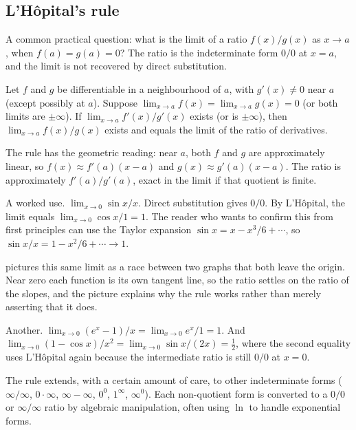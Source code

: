 \subsection{L'H\^opital's rule}

A common practical question: what is the limit of a ratio
$f(x)/g(x)$ as $x \to a$, when $f(a) = g(a) = 0$? The ratio is
the indeterminate form $0/0$ at $x = a$, and the limit is not
recovered by direct substitution.

\begin{theorem}
Let $f$ and $g$ be differentiable in a neighbourhood of $a$, with
$g'(x) \neq 0$ near $a$ (except possibly at $a$). Suppose
$\lim_{x \to a} f(x) = \lim_{x \to a} g(x) = 0$ (or both limits
are $\pm \infty$). If $\lim_{x \to a} f'(x)/g'(x)$ exists (or is
$\pm \infty$), then $\lim_{x \to a} f(x)/g(x)$ exists and equals
the limit of the ratio of derivatives.
\end{theorem}

The rule has the geometric reading: near $a$, both $f$ and $g$
are approximately linear, so $f(x) \approx f'(a)(x - a)$ and
$g(x) \approx g'(a)(x - a)$. The ratio is approximately
$f'(a)/g'(a)$, exact in the limit if that quotient is finite.

A worked use. $\lim_{x \to 0} \sin x / x$. Direct substitution
gives $0/0$. By L'H\^opital, the limit equals $\lim_{x \to 0}
\cos x / 1 = 1$. The reader who wants to confirm this from first
principles can use the Taylor expansion $\sin x = x - x^{3}/6 +
\cdots$, so $\sin x / x = 1 - x^{2}/6 + \cdots \to 1$.



 pictures this same
limit as a race between two graphs that both leave the origin. Near
zero each function is its own tangent line, so the ratio settles on
the ratio of the slopes, and the picture explains why the rule works
rather than merely asserting that it does.

Another. $\lim_{x \to 0} (e^{x} - 1)/x = \lim_{x \to 0} e^{x}/1
= 1$. And $\lim_{x \to 0} (1 - \cos x)/x^{2} = \lim_{x \to 0}
\sin x / (2 x) = \tfrac{1}{2}$, where the second equality uses
L'H\^opital again because the intermediate ratio is still $0/0$
at $x = 0$.

The rule extends, with a certain amount of care, to other
indeterminate forms ($\infty/\infty$, $0 \cdot \infty$,
$\infty - \infty$, $0^{0}$, $1^{\infty}$, $\infty^{0}$). Each
non-quotient form is converted to a $0/0$ or $\infty/\infty$ ratio
by algebraic manipulation, often using $\ln$ to handle exponential
forms.

